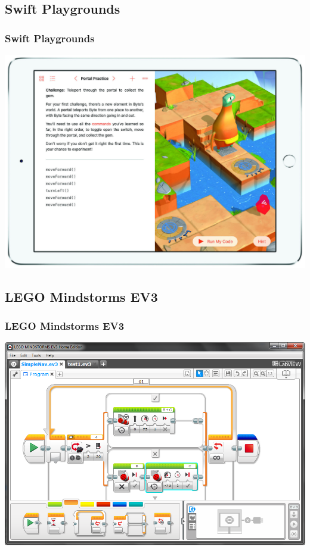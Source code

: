 \documentclass{beamer}
\begin{document}

\subsection{Swift Playgrounds}
\begin{frame}
\frametitle{Swift Playgrounds}
\vspace{-0.4cm}
\begin{center}
\includegraphics[scale=0.14]{images/swift.jpg}
\end{center}
\end{frame}


\subsection{LEGO Mindstorms EV3}
\begin{frame}
\frametitle{LEGO Mindstorms EV3}
\begin{center}
\includegraphics[scale=0.43]{images/lego.png}
\end{center}
\end{frame}
\end{document}

